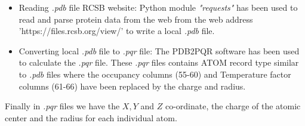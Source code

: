 \begin{itemize}
 	\item Reading \textit{.pdb} file RCSB website: Python module \textit{"requests"} has been used to read and parse protein data from the web from the web address 'https://files.rcsb.org/view/' to write a local \textit{.pdb} file. 
	\item Converting  local \textit{.pdb} file to \textit{.pqr} file: The PDB2PQR software \cite{PDB2PQR} has been used to calculate the {\it .pqr} file. These \textit{.pqr} files contains ATOM record type similar to \textit{.pdb} files where the occupancy columns (55-60) and Temperature factor columns (61-66) have been replaced by the charge and radius.     
 \end{itemize}

Finally in \textit{.pqr} files we have the $X,Y$ and $Z$ co-ordinate, the charge of the atomic center and the radius for each individual atom.  